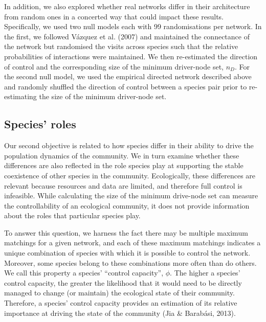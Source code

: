 \documentclass[a4paper]{artikel1}
\theoremstyle{definition}
\theoremstyle{definition}
\theoremstyle{definition}
\theoremstyle{remark}
\begin{document}
In addition, we also explored whether real networks differ in their
architecture from random ones in a concerted way that could impact these
results. Specifically, we used two null models each with 99
randomisations per network. In the first, we followed Vázquez et al.
(2007) and maintained the connectance of the network but randomised the
visits across species such that the relative probabilities of
interactions were maintained. We then re-estimated the direction of
control and the corresponding size of the minimum driver-node set,
\(n_D\). For the second null model, we used the empirical directed
network described above and randomly shuffled the direction of control
between a species pair prior to re-estimating the size of the minimum
driver-node set.

\subsection{Species' roles}\label{species-roles}

Our second objective is related to how species differ in their ability
to drive the population dynamics of the community. We in turn examine
whether these differences are also reflected in the role species play at
supporting the stable coexistence of other species in the community.
Ecologically, these differences are relevant because resources and data
are limited, and therefore full control is infeasible. While calculating
the size of the minimum drive-node set can measure the controllability
of an ecological community, it does not provide information about the
roles that particular species play.

To answer this question, we harness the fact there may be multiple
maximum matchings for a given network, and each of these maximum
matchings indicates a unique combination of species with which it is
possible to control the network. Moreover, some species belong to these
combinations more often than do others. We call this property a species'
``control capacity'', \(\phi\). The higher a species' control capacity,
the greater the likelihood that it would need to be directly managed to
change (or maintain) the ecological state of their community. Therefore,
a species' control capacity provides an estimation of its relative
importance at driving the state of the community (Jia \& Barabási,
2013).
\end{document}
